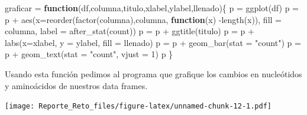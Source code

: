 \documentclass[
  12pt,
]{article}
\newenvironment{Shaded}{\begin{snugshade}}{\end{snugshade}}
\newcommand{\AttributeTok}[1]{\textcolor[rgb]{0.77,0.63,0.00}{#1}}
\newcommand{\ControlFlowTok}[1]{\textcolor[rgb]{0.13,0.29,0.53}{\textbf{#1}}}
\newcommand{\DecValTok}[1]{\textcolor[rgb]{0.00,0.00,0.81}{#1}}
\newcommand{\FunctionTok}[1]{\textcolor[rgb]{0.00,0.00,0.00}{#1}}
\newcommand{\NormalTok}[1]{#1}
\newcommand{\OtherTok}[1]{\textcolor[rgb]{0.56,0.35,0.01}{#1}}
\newcommand{\SpecialCharTok}[1]{\textcolor[rgb]{0.00,0.00,0.00}{#1}}
\newcommand{\StringTok}[1]{\textcolor[rgb]{0.31,0.60,0.02}{#1}}
\begin{document}
\begin{Shaded}
\begin{Highlighting}[]
\NormalTok{graficar }\OtherTok{=} \ControlFlowTok{function}\NormalTok{(df,columna,titulo,xlabel,ylabel,llenado)\{}
\NormalTok{  p }\OtherTok{=} \FunctionTok{ggplot}\NormalTok{(df)}
\NormalTok{  p }\OtherTok{=}\NormalTok{ p }\SpecialCharTok{+} \FunctionTok{aes}\NormalTok{(}\AttributeTok{x=}\FunctionTok{reorder}\NormalTok{(}\FunctionTok{factor}\NormalTok{(columna),columna, }\ControlFlowTok{function}\NormalTok{(x) }\SpecialCharTok{{-}}\FunctionTok{length}\NormalTok{(x)), }\AttributeTok{fill =}\NormalTok{ columna, }\AttributeTok{label =} \FunctionTok{after\_stat}\NormalTok{(count))}
\NormalTok{  p }\OtherTok{=}\NormalTok{ p }\SpecialCharTok{+} \FunctionTok{ggtitle}\NormalTok{(titulo)}
\NormalTok{  p }\OtherTok{=}\NormalTok{ p }\SpecialCharTok{+} \FunctionTok{labs}\NormalTok{(}\AttributeTok{x=}\NormalTok{xlabel, }\AttributeTok{y =}\NormalTok{ ylabel, }\AttributeTok{fill =}\NormalTok{ llenado)}
\NormalTok{  p }\OtherTok{=}\NormalTok{ p }\SpecialCharTok{+} \FunctionTok{geom\_bar}\NormalTok{(}\AttributeTok{stat =} \StringTok{"count"}\NormalTok{)}
\NormalTok{  p }\OtherTok{=}\NormalTok{ p }\SpecialCharTok{+} \FunctionTok{geom\_text}\NormalTok{(}\AttributeTok{stat =} \StringTok{"count"}\NormalTok{, }\AttributeTok{vjust =} \DecValTok{1}\NormalTok{)}
\NormalTok{  p}
\NormalTok{\}}
\end{Highlighting}
\end{Shaded}

Usando esta función pedimos al programa que grafique los cambios en
nucleótidos y aminoácidos de nuestros data frames.

\begin{Shaded}
\end{Shaded}

\texttt{[image: Reporte\_Reto\_files/figure-latex/unnamed-chunk-12-1.pdf]}

\begin{Shaded}
\end{Shaded}
\end{document}
